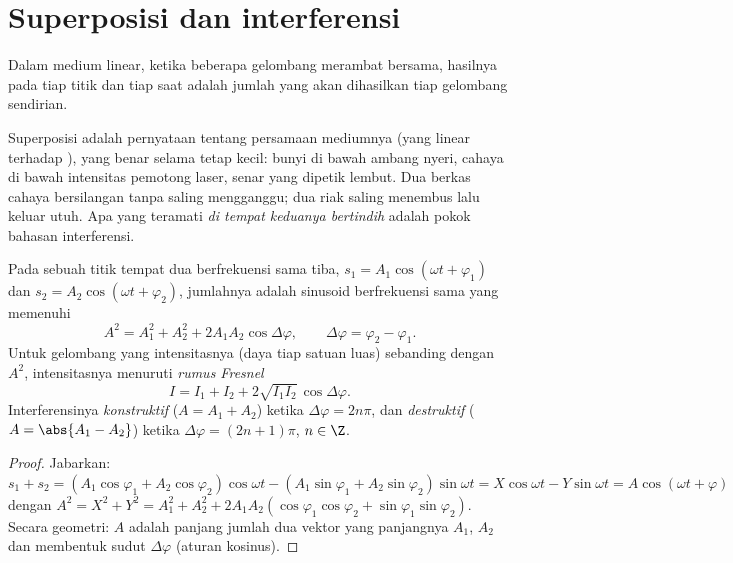 \section{Superposisi dan interferensi}

\begin{theorem}[Superposisi]\label{thm:b1:wave-propagation:superposition}
Dalam medium linear, ketika beberapa gelombang merambat bersama, 
hasilnya pada tiap titik dan tiap saat adalah jumlah  yang akan
dihasilkan tiap gelombang sendirian.
\end{theorem}
\admitted

\begin{remark}[Kelinearan]\label{rem:b1:wave-propagation:linearity}
Superposisi adalah pernyataan tentang persamaan mediumnya (yang linear
terhadap ), yang benar selama  tetap kecil: bunyi
di bawah ambang nyeri, cahaya di bawah intensitas pemotong laser, senar
yang dipetik lembut. Dua berkas cahaya bersilangan tanpa saling
mengganggu; dua riak saling menembus lalu keluar utuh. Apa yang teramati
\emph{di tempat keduanya bertindih} adalah pokok bahasan interferensi.
\end{remark}

\begin{theorem}\label{thm:b1:wave-propagation:fresnel}
Pada sebuah titik tempat dua  berfrekuensi sama tiba,
$s_1 = A_1\cos(\omega t + \varphi_1)$ dan $s_2 = A_2\cos(\omega t + \varphi_2)$,
jumlahnya adalah sinusoid berfrekuensi sama yang  memenuhi
\[
A^2 = A_1^2 + A_2^2 + 2A_1A_2\cos\Delta\varphi,
\qquad \Delta\varphi = \varphi_2 - \varphi_1 .
\]
Untuk gelombang yang intensitasnya (daya tiap satuan luas) sebanding
dengan $A^2$, intensitasnya menuruti \emph{rumus Fresnel}
\[
I = I_1 + I_2 + 2\sqrt{I_1 I_2}\,\cos\Delta\varphi .
\]
Interferensinya \emph{konstruktif} ($A = A_1 + A_2$) ketika
$\Delta\varphi = 2n\pi$, dan \emph{destruktif} ($A = \abs{A_1 - A_2}$)
ketika $\Delta\varphi = (2n + 1)\pi$, $n \in \Z$.
\end{theorem}

\begin{proof}
Jabarkan: $s_1 + s_2 = (A_1\cos\varphi_1 + A_2\cos\varphi_2)\cos\omega t -
(A_1\sin\varphi_1 + A_2\sin\varphi_2)\sin\omega t = X\cos\omega t -
Y\sin\omega t = A\cos(\omega t + \varphi)$ dengan $A^2 = X^2 + Y^2 =
A_1^2 + A_2^2 + 2A_1A_2(\cos\varphi_1\cos\varphi_2 + \sin\varphi_1\sin\varphi_2)$.
Secara geometri: $A$ adalah panjang jumlah dua vektor yang panjangnya
$A_1$, $A_2$ dan membentuk sudut $\Delta\varphi$ (aturan kosinus).
\end{proof}

